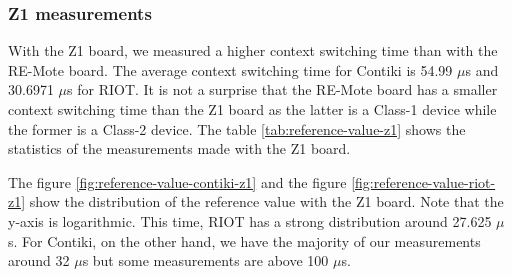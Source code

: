 \subsubsection{Z1 measurements}
With the Z1 board, we measured a higher context switching time than with the RE-Mote board. The average context switching time for Contiki is 54.99 $\mu$s and 30.6971 $\mu$s for RIOT.
It is not a surprise that the RE-Mote board has a smaller context switching time than the Z1 board as the latter is a Class-1 device while the former is a Class-2 device.
The table \ref{tab:reference-value-z1} shows the statistics of the measurements made with the Z1 board.



The figure \ref{fig:reference-value-contiki-z1} and the figure \ref{fig:reference-value-riot-z1} show the distribution of the reference value with the Z1 board.
Note that the y-axis is logarithmic.
This time, RIOT has a strong distribution around 27.625 $\mu$s.
For Contiki, on the other hand, we have the majority of our measurements around 32 $\mu$s but some measurements are above 100 $\mu$s.

